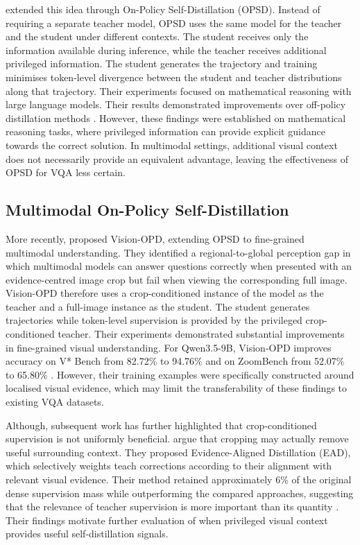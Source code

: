 
\textcite{zhao2601self} extended this idea through On-Policy Self-Distillation (OPSD). Instead
of requiring a separate teacher model, OPSD uses the same model for the teacher and the student under
different contexts. The student receives only the information available during inference, while
the teacher receives additional privileged information. The student generates the trajectory and
training minimises token-level divergence between the student and teacher distributions along
that trajectory. Their experiments focused on mathematical reasoning with large language models.
Their results demonstrated improvements over off-policy distillation methods \parencite{zhao2601self}. However, these findings
were established on mathematical reasoning tasks, where privileged information can provide explicit
guidance towards the correct solution. In multimodal settings, additional visual context does not
necessarily provide an equivalent advantage, leaving the effectiveness of OPSD for VQA less certain.

\subsection{Multimodal On-Policy Self-Distillation}

More recently, \textcite{yuan2026vision} proposed Vision-OPD, extending OPSD to fine-grained 
multimodal understanding. They identified a regional-to-global perception gap in which
multimodal models can answer questions correctly when presented with an evidence-centred image 
crop but fail when viewing the corresponding full image. Vision-OPD therefore uses a crop-conditioned
instance of the model as the teacher and a full-image instance as the student. The student
generates trajectories while token-level supervision is provided by the privileged crop-conditioned
teacher. Their experiments demonstrated substantial improvements in fine-grained visual understanding.
For Qwen3.5-9B, Vision-OPD improves accuracy on V* Bench from 82.72\% to 94.76\% and on ZoomBench from 
52.07\% to 65.80\% \parencite{yuan2026vision}. However, their training examples were specifically
constructed around localised visual evidence, which may limit the transferability of these findings to 
existing VQA datasets.

Although, subsequent work has further highlighted that crop-conditioned supervision is not uniformly 
beneficial. \textcite{hu2026evidencealigned} argue that cropping may actually remove useful
surrounding context. They proposed Evidence-Aligned Distillation (EAD), which selectively weights teach 
corrections according to their alignment with relevant visual evidence. Their method retained approximately 6\% of the
original dense supervision mass while outperforming the compared approaches, suggesting that the relevance of teacher 
supervision is more important than its quantity \parencite{hu2026evidencealigned}. Their findings motivate further evaluation of when privileged visual context
provides useful self-distillation signals.

